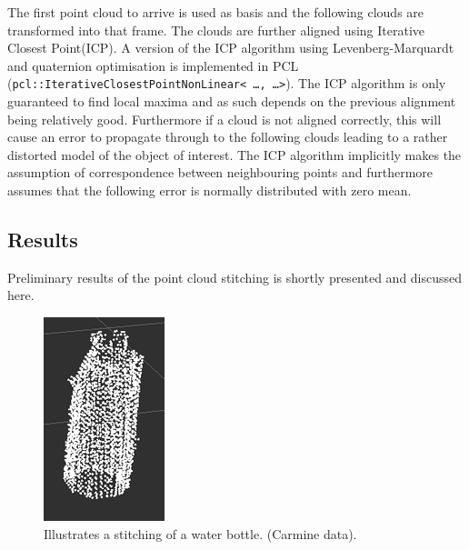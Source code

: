 
The first point cloud to arrive is used as basis and the following clouds are transformed into that frame. The clouds are further aligned using Iterative Closest Point(ICP). A version of the ICP algorithm using Levenberg-Marquardt and quaternion optimisation\cite{Rusinkiewicz} is implemented in PCL (\texttt{pcl::IterativeClosestPointNonLinear< \ldots , \ldots >}). The ICP algorithm is only guaranteed to find local maxima and as such depends on the previous alignment being relatively good. Furthermore if a cloud is not aligned correctly, this will cause an error to propagate through to the following clouds leading to a rather distorted model of the object of interest\cite{choe2007registration}. The ICP algorithm implicitly makes the assumption of correspondence between neighbouring points and furthermore assumes that the following error is normally distributed with zero mean.

\subsection{Results}
Preliminary results of the point cloud stitching is shortly presented and discussed here. 

\begin{figure}[htb]
	\begin{center}
		\includegraphics[scale=0.7,trim=0 0 0 0]{graphics/07_modelling/bottle.png}%
		\caption{Illustrates a stitching of a water bottle. (Carmine data).}
		\label{fig:bottle}
	\end{center}
\end{figure}

